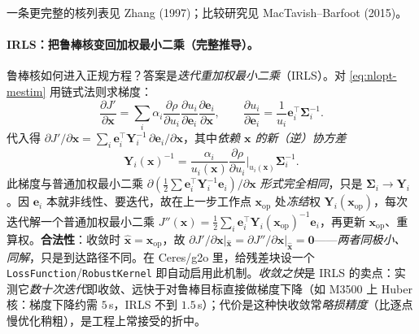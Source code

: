 一条更完整的核列表见 Zhang (1997)\cite{zhang1997parameter}；比较研究见 MacTavish--Barfoot (2015)。

\paragraph{IRLS：把鲁棒核变回加权最小二乘（完整推导）。}\cite{barfoot2024state,carlone2026handbook}
鲁棒核如何进入正规方程？答案是\emph{迭代重加权最小二乘}（IRLS）。对 \cref{eq:nlopt-mestim} 用链式法则求梯度：
\begin{equation}
  \frac{\partial J'}{\partial\mathbf{x}}=\sum_i\alpha_i\frac{\partial\rho}{\partial u_i}\frac{\partial u_i}{\partial\mathbf{e}_i}\frac{\partial\mathbf{e}_i}{\partial\mathbf{x}},
  \qquad \frac{\partial u_i}{\partial\mathbf{e}_i}=\frac{1}{u_i}\mathbf{e}_i^\top\boldsymbol{\Sigma}_i^{-1}.
  \label{eq:nlopt-irls-grad}
\end{equation}
代入得 $\partial J'/\partial\mathbf{x}=\sum_i\mathbf{e}_i^\top\mathbf{Y}_i^{-1}\,\partial\mathbf{e}_i/\partial\mathbf{x}$，其中\emph{依赖 $\mathbf{x}$ 的新（逆）协方差}
\begin{equation}
  \mathbf{Y}_i(\mathbf{x})^{-1}=\frac{\alpha_i}{u_i(\mathbf{x})}\frac{\partial\rho}{\partial u_i}\Big|_{u_i(\mathbf{x})}\boldsymbol{\Sigma}_i^{-1}.
  \label{eq:irls}
\end{equation}
此梯度与普通加权最小二乘 $\partial(\tfrac12\sum\mathbf{e}_i^\top\mathbf{Y}_i^{-1}\mathbf{e}_i)/\partial\mathbf{x}$ \emph{形式完全相同}，只是 $\boldsymbol{\Sigma}_i\to\mathbf{Y}_i$。因 $\mathbf{e}_i$ 本就非线性、要迭代，故在上一步工作点 $\mathbf{x}_{\mathrm{op}}$ 处\emph{冻结}权 $\mathbf{Y}_i(\mathbf{x}_{\mathrm{op}})$，每次迭代解一个普通加权最小二乘 $J''(\mathbf{x})=\tfrac12\sum_i\mathbf{e}_i^\top\mathbf{Y}_i(\mathbf{x}_{\mathrm{op}})^{-1}\mathbf{e}_i$，再更新 $\mathbf{x}_{\mathrm{op}}$、重算权。\textbf{合法性}：收敛时 $\hat{\mathbf{x}}=\mathbf{x}_{\mathrm{op}}$，故 $\partial J'/\partial\mathbf{x}|_{\hat{\mathbf{x}}}=\partial J''/\partial\mathbf{x}|_{\hat{\mathbf{x}}}=\mathbf{0}$——\emph{两者同极小、同解}，只是到达路径不同。在 Ceres/g2o 里，给残差块设一个 \texttt{LossFunction}/\allowbreak\texttt{RobustKernel} 即自动启用此机制。\emph{收敛之快}是 IRLS 的卖点：实测它\emph{数十次迭代}即收敛、远快于对鲁棒目标直接做梯度下降（如 M3500 上 Huber 核：梯度下降约需 $5$\,s，IRLS 不到 $1.5$\,s\cite{carlone2026handbook}）；代价是这种快收敛常\emph{略损精度}（比逐点慢优化稍粗），是工程上常接受的折中。

